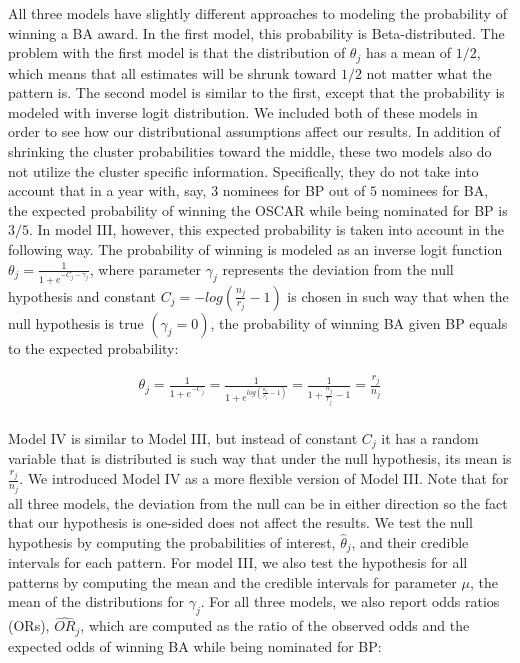 \documentclass[10pt,letterpaper]{article}
\begin{document}
All three models have slightly different approaches to modeling the probability of winning a BA award. In the first model, this probability is Beta-distributed. The problem with the first model is that the distribution of $\theta_j$ has a mean of $1/2$, which means that all estimates will be shrunk toward $1/2$ not matter what the pattern is. The second model is similar to the first, except that the probability is modeled with inverse logit distribution. We included both of these models in order to see how our distributional assumptions affect our results. In addition of shrinking the cluster probabilities toward the middle, these two models also do not utilize the cluster specific information. Specifically, they do not take into account that in a year with, say, $3$ nominees for BP out of $5$ nominees for BA, the expected probability of winning the OSCAR while being nominated for BP is $3/5$. In model III, however, this expected probability is taken into account in the following way. The probability of winning is modeled as an inverse logit function $\theta_j =\frac{1}{1+e^{-C_j - \gamma_j}}$, where parameter $\gamma_j$ represents the deviation from the null hypothesis and constant $C_j = -log\left(\frac{n_j}{r_j}-1\right)$ is chosen in such way that when the null hypothesis is true $(\gamma_j = 0)$, the probability of winning BA given BP equals to the expected probability:


\begin{align*}
	\theta_j =\frac{1}{1+e^{-C_j}} = \frac{1}{1+e^{log\left(\frac{n_j}{r_j}-1\right)}} =  \frac{1}{1+\frac{n_j}{r_j}-1}  = \frac{r_j}{n_j} \\
\end{align*}

Model IV is similar to Model III, but instead of constant $C_j$ it has a random variable that is distributed is such way that under the null hypothesis, its mean is $\frac{r_j}{n_j}$. We introduced Model IV as a more flexible version of Model III. Note that for all three models, the deviation from the null can be in either direction so the fact that our hypothesis is one-sided does not affect the results. We test the null hypothesis by computing the probabilities of interest, $\hat{\theta}_j$, and their credible intervals for each pattern. For model III, we also test the hypothesis for all patterns by computing the mean and the credible intervals for parameter $\mu$, the mean of the distributions for $\gamma_j$. For all three models, we also report odds ratios (ORs), $\widehat{OR}_j$, which are computed as the ratio of the observed odds and the expected odds of winning BA while being nominated for BP:
\end{document}
